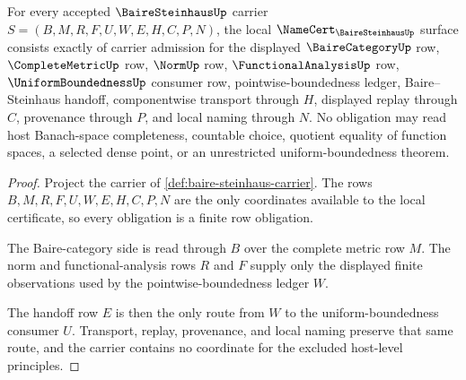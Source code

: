 \begin{theorem}
\label{thm:baire-steinhaus-namecert-obligations}
For every accepted $\BaireSteinhausUp$ carrier $S=(B,M,R,F,U,W,E,H,C,P,N)$, the local $\NameCert_{\BaireSteinhausUp}$ surface consists exactly of carrier admission for the displayed $\BaireCategoryUp$ row, $\CompleteMetricUp$ row, $\NormUp$ row, $\FunctionalAnalysisUp$ row, $\UniformBoundednessUp$ consumer row, pointwise-boundedness ledger, Baire--Steinhaus handoff, componentwise transport through $H$, displayed replay through $C$, provenance through $P$, and local naming through $N$. No obligation may read host Banach-space completeness, countable choice, quotient equality of function spaces, a selected dense point, or an unrestricted uniform-boundedness theorem.
\end{theorem}
\begin{proof}
Project the carrier of \autoref{def:baire-steinhaus-carrier}. The rows $B,M,R,F,U,W,E,H,C,P,N$ are the only coordinates available to the local certificate, so every obligation is a finite row obligation.

The Baire-category side is read through $B$ over the complete metric row $M$. The norm and functional-analysis rows $R$ and $F$ supply only the displayed finite observations used by the pointwise-boundedness ledger $W$.

The handoff row $E$ is then the only route from $W$ to the uniform-boundedness consumer $U$. Transport, replay, provenance, and local naming preserve that same route, and the carrier contains no coordinate for the excluded host-level principles.
\end{proof}

